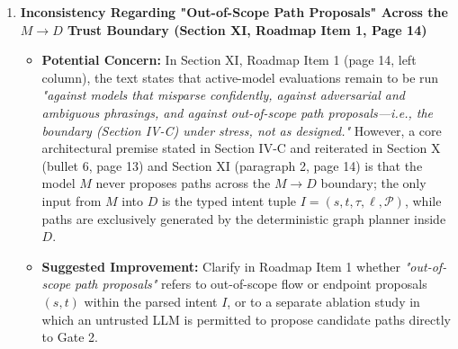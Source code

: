 \documentclass[11pt,a4paper]{article}
\begin{document}
\begin{enumerate}[leftmargin=1.6em,itemsep=3pt]
\item \textbf{Inconsistency Regarding "Out-of-Scope Path Proposals" Across the $M \to D$ Trust Boundary (Section XI, Roadmap Item 1, Page 14)}
\begin{itemize}[leftmargin=1.8em,itemsep=2pt]
\item \textbf{Potential Concern:} In Section XI, Roadmap Item 1 (page 14, left column), the text states that active-model evaluations remain to be run \emph{"against models that misparse confidently, against adversarial and ambiguous phrasings, and against out-of-scope path proposals—i.e., the boundary (Section IV-C) under stress, not as designed."} However, a core architectural premise stated in Section IV-C and reiterated in Section X (bullet 6, page 13) and Section XI (paragraph 2, page 14) is that the model $M$ never proposes paths across the $M \to D$ boundary; the only input from $M$ into $D$ is the typed intent tuple $I = (s, t, \tau, \ell, \mathcal{P})$, while paths are exclusively generated by the deterministic graph planner inside $D$.
\item \textbf{Suggested Improvement:} Clarify in Roadmap Item 1 whether \emph{"out-of-scope path proposals"} refers to out-of-scope flow or endpoint proposals $(s, t)$ within the parsed intent $I$, or to a separate ablation study in which an untrusted LLM is permitted to propose candidate paths directly to Gate 2.
\end{itemize}
\end{enumerate}
\end{document}
